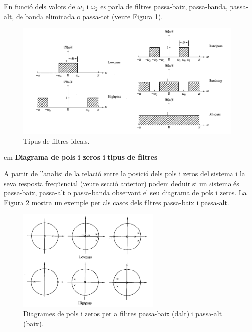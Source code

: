 \documentclass{article}
\begin{document}
En funció dels valors de $\omega_1$ i $\omega_2$ es parla de filtres passa-baix,
passa-banda, passa-alt, de banda eliminada o passa-tot (veure Figura \ref{idealfilters}).

\begin{figure}[htbp]
\begin{center}
\includegraphics[width=12cm]{idealfilters.png}
\end{center}
\caption{Tipus de filtres ideals.}
\label{idealfilters}
\end{figure}

 cm
\noindent
\textbf{Diagrama de pols i zeros i tipus de filtres}

A partir de l'analisi de la relació entre la posició dels pols i zeros del sistema i la seva
resposta freqüencial (veure secció anterior) podem deduir si un sistema és passa-baix, passa-alt
o passa-banda observant el seu diagrama de pols i zeros. La Figura \ref{polszerosfiltres}
mostra un exemple per als casos dels filtres passa-baix i passa-alt.

\begin{figure}[htbp]
\begin{center}
\includegraphics[width=7cm]{polszerosfiltres.png}
\end{center}
\caption{Diagrames de pols i zeros per a filtres passa-baix (dalt) i passa-alt (baix).}
\label{polszerosfiltres}
\end{figure}
\end{document}
